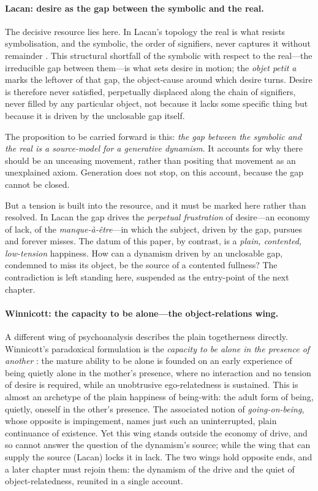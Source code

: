 \paragraph{Lacan: desire as the gap between the symbolic and the real.} The decisive resource lies here. In Lacan's topology the real is what resists symbolisation, and the symbolic, the order of signifiers, never captures it without remainder \parencite{lacan2006}. This structural shortfall of the symbolic with respect to the real---the irreducible gap between them---is what sets desire in motion; the \emph{objet petit a} marks the leftover of that gap, the object-cause around which desire turns. Desire is therefore never satisfied, perpetually displaced along the chain of signifiers, never filled by any particular object, not because it lacks some specific thing but because it is driven by the unclosable gap itself.

The proposition to be carried forward is this: \emph{the gap between the symbolic and the real is a source-model for a generative dynamism}. It accounts for why there should be an unceasing movement, rather than positing that movement as an unexplained axiom. Generation does not stop, on this account, because the gap cannot be closed.

But a tension is built into the resource, and it must be marked here rather than resolved. In Lacan the gap drives the \emph{perpetual frustration} of desire---an economy of lack, of the \emph{manque-à-être}---in which the subject, driven by the gap, pursues and forever misses. The datum of this paper, by contrast, is a \emph{plain, contented, low-tension} happiness. How can a dynamism driven by an unclosable gap, condemned to miss its object, be the source of a contented fullness? The contradiction is left standing here, suspended as the entry-point of the next chapter.

\paragraph{Winnicott: the capacity to be alone---the object-relations wing.} A different wing of psychoanalysis describes the plain togetherness directly. Winnicott's paradoxical formulation is the \emph{capacity to be alone in the presence of another} \parencite{winnicott1958}: the mature ability to be alone is founded on an early experience of being quietly alone in the mother's presence, where no interaction and no tension of desire is required, while an unobtrusive ego-relatedness is sustained. This is almost an archetype of the plain happiness of being-with: the adult form of being, quietly, oneself in the other's presence. The associated notion of \emph{going-on-being}, whose opposite is impingement, names just such an uninterrupted, plain continuance of existence. Yet this wing stands outside the economy of drive, and so cannot answer the question of the dynamism's source; while the wing that can supply the source (Lacan) locks it in lack. The two wings hold opposite ends, and a later chapter must rejoin them: the dynamism of the drive and the quiet of object-relatedness, reunited in a single account.

